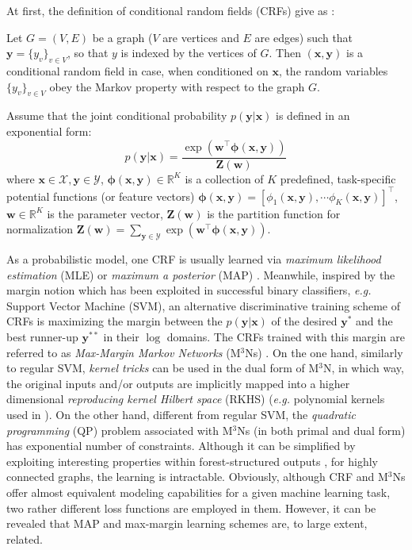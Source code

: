 At first, the definition of conditional random fields (CRFs) give as \citep{CRF}: 
\begin{definition}
    Let $G=(V,E)$ be a graph ($V$ are vertices and $E$ are edges) such that $\mathbf{y}=\{y_v\}_{v\in V}$, so that $y$ is indexed by the vertices of $G$. Then $(\mathbf{x,y})$ is a 
        conditional random field in case, when conditioned on $\mathbf{x}$, the random variables $\{y_v\}_{v\in V}$ obey the Markov property with respect to 
    the graph $G$.   
\label{def:CRF}
\end{definition}
Assume that the joint conditional probability $p(\mathbf{y|x})$ is defined in an exponential form: 
\begin{equation}
    p(\mathbf{y|x})=\frac{\exp(\mathbf{w}^\top \boldsymbol{\phi}(\mathbf{x,y}))}{\mathbf{Z(w)}}
\end{equation}
where $\mathbf{x}\in\mathcal{X},\mathbf{y}\in\mathcal{Y}$, $\boldsymbol{\phi}(\mathbf{x,y})\in\mathbb{R}^K$ is a collection of $K$ predefined, task-specific potential functions  (or feature vectors)
$\boldsymbol{\phi}(\mathbf{x,y})=[\phi_1(\mathbf{x,y}),\cdots \phi_K(\mathbf{x,y})]^\top$, $\mathbf{w}\in\mathbb{R}^K$ is the parameter vector,  
$\mathbf{Z(w)}$ is the partition function for normalization $\mathbf{Z(w)}=\sum_{\mathbf{y}\in\mathcal{Y}} \exp(\mathbf{w}^\top \boldsymbol{\phi}(\mathbf{x,y}))$. 

As a probabilistic model, one CRF is usually 
learned via \emph{maximum likelihood estimation} (MLE) or \emph{maximum a posterior} (MAP) \citep{Kumar03,CRF,Accelerated_CRF}. 
Meanwhile, inspired by the margin notion which has been exploited in successful binary classifiers, \emph{e.g.} Support Vector Machine (SVM),  
an alternative discriminative training scheme of CRFs is maximizing the margin between 
the $p(\mathbf{y|x})$ of the desired $\mathbf{y^*}$ and the best runner-up $\mathbf{y}^{**}$  in their $\log$ domains. The CRFs trained with this 
margin
are referred to as 
\emph{Max-Margin Markov Networks} (M$^3$Ns) \citep{Taskar03}. 
On the one hand, similarly to regular SVM, \emph{kernel tricks} can be used in the dual form of M$^3$N, in which way, the original inputs and/or outputs are implicitly mapped into a higher 
dimensional \emph{reproducing kernel Hilbert space} (RKHS) (\emph{e.g.} polynomial kernels used in \citep{Taskar03}).     
On the other hand, different from regular SVM, the \emph{quadratic programming} 
(QP) problem associated with M$^3$Ns (in both primal and dual form) has exponential number of constraints. 
Although it can be simplified by exploiting interesting properties within forest-structured outputs \citep{Taskar03},  
for highly connected graphs, the learning is intractable.      
Obviously, although CRF and  M$^3$Ns offer almost equivalent modeling capabilities for a given machine learning task, two rather different loss functions are 
employed in them. However, it can be revealed that MAP and max-margin learning schemes are, to large extent, related. 
